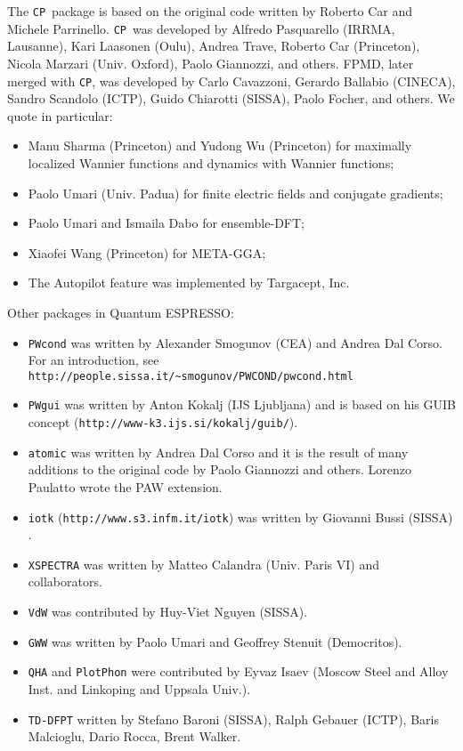 \documentclass[12pt,a4paper]{article}
\def\qe{{\sc Quantum ESPRESSO}}
\def\CP{\texttt{CP}}
\begin{document}
The \CP\ package is based on the original code written by
 Roberto Car
and Michele Parrinello. \CP\ was developed by Alfredo Pasquarello
(IRRMA, Lausanne), Kari Laasonen (Oulu), Andrea Trave, Roberto
Car (Princeton), Nicola Marzari (Univ. Oxford), Paolo Giannozzi, and others.
FPMD, later merged with \CP, was developed by Carlo
Cavazzoni, 
Gerardo Ballabio (CINECA), Sandro Scandolo (ICTP), 
Guido Chiarotti (SISSA), Paolo Focher, and others.
We quote in particular:
\begin{itemize}
  \item Manu Sharma (Princeton) and Yudong Wu (Princeton) for
   maximally localized Wannier functions and dynamics with 
   Wannier functions;
  \item Paolo Umari (Univ. Padua) for finite electric fields and conjugate
   gradients;
  \item Paolo Umari and Ismaila Dabo for ensemble-DFT;
  \item Xiaofei Wang (Princeton) for META-GGA;
  \item The Autopilot feature was implemented by Targacept, Inc.
\end{itemize}
Other packages in \qe:
\begin{itemize}
\item
\texttt{PWcond} was written by Alexander Smogunov (CEA) and Andrea 
Dal Corso. For an introduction, see 
\texttt{http://people.sissa.it/\~{}smogunov/PWCOND/pwcond.html}
\item
\texttt{PWgui} was written by Anton Kokalj (IJS Ljubljana) and is 
based on his GUIB concept (\texttt{http://www-k3.ijs.si/kokalj/guib/}).
\item
\texttt{atomic} was written by Andrea Dal Corso and it is the result 
of many additions to the original code by Paolo Giannozzi 
and others. Lorenzo Paulatto wrote the PAW extension.
\item
\texttt{iotk} (\texttt{http://www.s3.infm.it/iotk}) was written by Giovanni Bussi  (SISSA)  .
\item
\texttt{XSPECTRA} was written by Matteo Calandra (Univ. Paris VI)
and collaborators.
\item \texttt{VdW} was contributed by Huy-Viet Nguyen (SISSA).
\item \texttt{GWW} was written by Paolo Umari and Geoffrey Stenuit (Democritos).
\item
\texttt{QHA} and \texttt{PlotPhon} were contributed by Eyvaz Isaev
 (Moscow Steel and Alloy Inst. and Linkoping and Uppsala Univ.).
\item \texttt{TD-DFPT} written by Stefano Baroni (SISSA), Ralph Gebauer (ICTP), 
Baris Malcioglu, Dario Rocca, Brent Walker.
\end{itemize}
\end{document}
